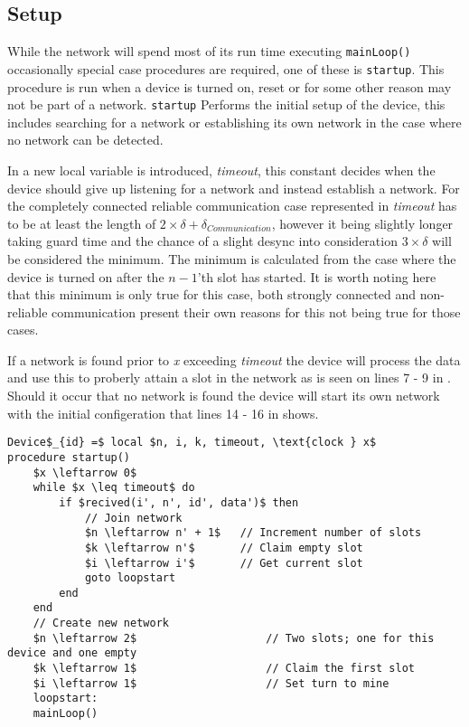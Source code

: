 \subsection{Setup} %
\label{sub:setup} 
While the network will spend most of its run time executing \texttt{mainLoop()} occasionally special case procedures are required, one of these is \texttt{startup}.
This procedure is run when a device is turned on, reset or for some other reason may not be part of a network. 
\texttt{startup} Performs the initial setup of the device, this includes searching for a network or establishing its own network in the case where no network can be detected.
 
\bigskip \noindent
In  a new local variable is introduced, \textit{timeout}, this constant decides when the device should give up listening for a network and instead establish a network.
For the completely connected reliable communication case represented in  \textit{timeout} has to be at least the length of $2 \times \delta + \delta_{Communication}$, however it being slightly longer taking guard time and the chance of a slight desync into consideration $3 \times \delta$ will be considered the minimum.
The minimum is calculated from the case where the device is turned on after the $n-1$'th slot has started.
It is worth noting here that this minimum is only true for this case, both strongly connected and non-reliable communication present their own reasons for this not being true for those cases.

If a network is found prior to \textit{x} exceeding \textit{timeout} the device will process the data and use this to proberly attain a slot in the network as is seen on lines 7 - 9 in .
Should it occur that no network is found the device will start its own network with the initial configeration that lines 14 - 16 in  shows.
\begin{lstlisting}[label=lst:setup,style=pseudocode,mathescape=true,caption={Pseudocode example of the special case procedure startup()}]
Device$_{id} =$ local $n, i, k, timeout, \text{clock } x$
procedure startup()
	$x \leftarrow 0$
	while $x \leq timeout$ do
		if $recived(i', n', id', data')$ then
			// Join network
			$n \leftarrow n' + 1$	// Increment number of slots
			$k \leftarrow n'$		// Claim empty slot
			$i \leftarrow i'$		// Get current slot
			goto loopstart
		end
	end
	// Create new network
	$n \leftarrow 2$					// Two slots; one for this device and one empty
	$k \leftarrow 1$					// Claim the first slot
	$i \leftarrow 1$					// Set turn to mine
	loopstart:
	mainLoop()
\end{lstlisting}   
